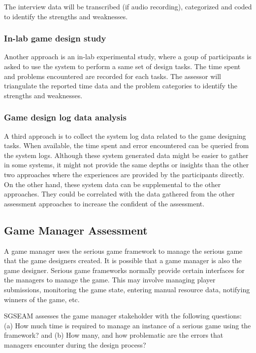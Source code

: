 The interview data will be transcribed (if audio recording), categorized and coded to identify the
strengths and weaknesses.

\subsubsection{In-lab game design study}
\label{In-lab game design study}

Another approach is an in-lab experimental study, where a
goup of participants is asked to use the system to perform a same set of design tasks. The time
spent and problems encountered are recorded for each tasks. The assessor will triangulate the
reported time data and the problem categories to identify the strengths and weaknesses.

\subsubsection{Game design log data analysis}
\label{Game design log data analysis}

A third approach is to collect the system log data related to the game designing tasks. When
available, the time spent and error encountered can be queried from the system logs. Although these
system generated data might be easier to gather in some systems, it might not provide the same
depths or insights than the other two approaches where the experiences are provided by the
participants directly. On the other hand, these system data can be supplemental to the other
approaches. They could be correlated with the data gathered from the other assessment approaches
 to increase the confident of the assessment.

\subsection{Game Manager Assessment}

A game manager uses the serious game framework to manage the serious game that the game
designers created. It is possible that a game manager is also the game designer.
Serious game frameworks normally provide certain interfaces for the managers to manage the
game. This may involve managing player submissions, monitoring the game state, entering
manual resource data, notifying winners of the game, etc.

SGSEAM assesses the game manager stakeholder with the following questions: (a) How much time is
required to manage an instance of a serious game using the framework? and (b) How many,
and how problematic are the errors that managers encounter during the design process?

